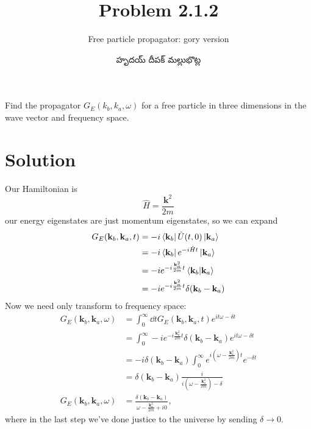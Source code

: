 \documentclass{article}
\title{Problem 2.1.2}
\subtitle{Free particle propagator: gory version}
\author{\begin{telugu}హృదయ్ దీపక్ మల్లుభొట్ల\end{telugu}}
\date{}
\renewcommand{\vec}[1]{\mathbf{#1}}
\newcommand{\ham}{\hat{H}}
\begin{document}
	\maketitle
	Find the propagator $G_E(k_b, k_a, \omega)$ for a free particle in three dimensions in the wave vector and frequency space.

	\section{Solution} \label{sec:solution}

	Our Hamiltonian is
	\begin{equation}
		\ham = \frac{\vec{k}^2}{2m}
	\end{equation}
	\triv our energy eigenstates are just momentum eigenstates, so we can expand
	\begin{align}
		G_E(\vec{k}_b, \vec{k}_a, t) &= -i \bra{\vec{k}_b} \hat{U}(t, 0) \ket{\vec{k}_a} \\
		&= -i \bra{\vec{k}_b} e^{-i \ham t} \ket{\vec{k}_a} \\
		&= -i e^{-i \frac{\vec{k}_a^2}{2m} t} \bra{\vec{k}_b}\ket{\vec{k}_a} \\
		&= -i e^{-i \frac{\vec{k}_a^2}{2m} t} \delta(\vec{k}_b - \vec{k}_a)
	\end{align}
	Now we need only transform to frequency space:
	\begin{align}
		G_E(\vec{k}_b, \vec{k}_a, \omega) &= \int_0^\infty \dd{t} G_E(\vec{k}_b, \vec{k}_a, t) e^{i t \omega - \delta t} \\
		&= \int_0^\infty -i e^{-i \frac{\vec{k}_a^2}{2m} t} \delta(\vec{k}_b - \vec{k}_a)e^{i t \omega - \delta t} \\
		&= -i \delta(\vec{k}_b - \vec{k}_a) \int_0^\infty e^{i (\omega - \frac{\vec{k}_a^2}{2m}) t} e^{- \delta t} \\
		&= \delta(\vec{k}_b - \vec{k}_a) \frac{i}{i (\omega - \frac{\vec{k}_a^2}{2m}) - \delta}\\
		G_E(\vec{k}_b, \vec{k}_a, \omega) &=  \frac{\delta(\vec{k}_b - \vec{k}_a)}{\omega - \frac{\vec{k}_a^2}{2m} + i 0},
	\end{align}
	where in the last step we've done justice to the universe by sending $\delta \rightarrow 0$.


	\newpage
	\listoftodos
\end{document}
